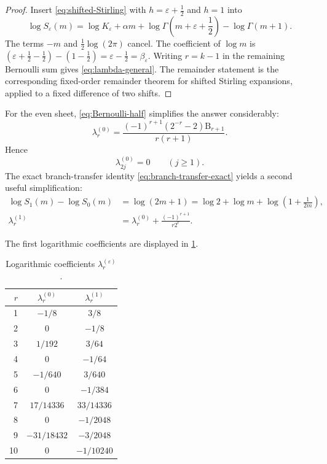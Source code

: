 \documentclass[11pt,a4paper]{article}
\theoremstyle{clean}
\theoremstyle{definition}
\newcommand{\eps}{\varepsilon}
\newcommand{\al}{\alpha}
\newcommand{\be}{\beta}
\newcommand{\B}{\mathrm B}
\begin{document}
\begin{proof}
Insert \cref{eq:shifted-Stirling} with \(h=\eps+\tfrac12\) and \(h=1\) into
\begin{equation*}
 \log S_\eps(m)=\log K_\eps+\al m+
 \log\Gamma\!\left(m+\eps+\frac12\right)-\log\Gamma(m+1).
\end{equation*}
The terms \(-m\) and \(\tfrac12\log(2\pi)\) cancel.  The coefficient of \(\log m\) is
\((\eps+\tfrac12-\tfrac12)-(1-\tfrac12)=\eps-\tfrac12=\be_\eps\).
Writing \(r=k-1\) in the remaining Bernoulli sum gives \cref{eq:lambda-general}.  The remainder statement is the corresponding fixed-order remainder theorem for shifted Stirling expansions, applied to a fixed difference of two shifts.
\end{proof}

For the even sheet, \cref{eq:Bernoulli-half} simplifies the answer considerably:
\begin{equation}
 \lambda_r^{(0)}=
 \frac{(-1)^{r+1}(2^{-r}-2)\B_{r+1}}{r(r+1)}.
 \label{eq:lambda-even}
\end{equation}
Hence
\begin{equation}
 \lambda_{2j}^{(0)}=0\qquad(j\ge1).
 \label{eq:lambda-even-zero}
\end{equation}
The exact branch-transfer identity \cref{eq:branch-transfer-exact} yields a second useful simplification:
\begin{align}
 \log S_1(m)-\log S_0(m)
 &=\log(2m+1)=\log2+\log m+\log\!\left(1+\frac1{2m}\right),
 \nonumber\\[-0.2em]
 \lambda_r^{(1)}
 &=\lambda_r^{(0)}+\frac{(-1)^{r+1}}{r2^r}.
 \label{eq:lambda-transfer}
\end{align}

The first logarithmic coefficients are displayed in \cref{tab:lambda}.

\begin{table}[htbp]
\centering
\caption{Logarithmic coefficients \(\lambda_r^{(\eps)}\).}
\label{tab:lambda}
\begin{tabular}{@{}rcc@{}}
\toprule
\(r\) & \(\lambda_r^{(0)}\) & \(\lambda_r^{(1)}\)\\
\midrule
1  & \(-1/8\)       & \(3/8\)\\
2  & \(0\)          & \(-1/8\)\\
3  & \(1/192\)      & \(3/64\)\\
4  & \(0\)          & \(-1/64\)\\
5  & \(-1/640\)     & \(3/640\)\\
6  & \(0\)          & \(-1/384\)\\
7  & \(17/14336\)   & \(33/14336\)\\
8  & \(0\)          & \(-1/2048\)\\
9  & \(-31/18432\)  & \(-3/2048\)\\
10 & \(0\)          & \(-1/10240\)\\
\bottomrule
\end{tabular}
\end{table}
\end{document}
